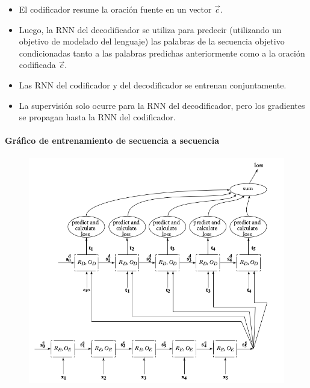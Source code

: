 \begin{itemize}
\item El codificador resume la oración fuente en un vector $\vec{c}$.
\item Luego, la RNN del decodificador se utiliza para predecir (utilizando un objetivo de modelado del lenguaje) las palabras de la secuencia objetivo condicionadas tanto a las palabras predichas anteriormente como a la oración codificada $\vec{c}$.
\item Las RNN del codificador y del decodificador se entrenan conjuntamente.
\item La supervisión solo ocurre para la RNN del decodificador, pero los gradientes se propagan hasta la RNN del codificador.
\end{itemize}


\paragraph{Gráfico de entrenamiento de secuencia a secuencia}
         \begin{figure}[h]
        	\includegraphics[scale = 0.35]{pics/seq2se2train.png}
        \end{figure}





